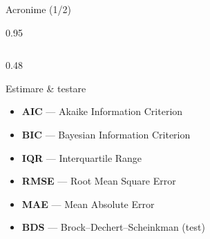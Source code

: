 \documentclass[9pt, aspectratio=169, t]{beamer}
\begin{document}
\begin{frame}{Acronime (1/2)}
\begin{cminipage}{0.95\textwidth}
{\begin{columns}[T]
\begin{column}{0.48\textwidth}
\begin{exampleblock}{Estimare \& testare}
\begin{itemize}
                    \item \textbf{AIC} --- Akaike Information Criterion
                    \item \textbf{BIC} --- Bayesian Information Criterion
                    \item \textbf{IQR} --- Interquartile Range
                    \item \textbf{RMSE} --- Root Mean Square Error
                    \item \textbf{MAE} --- Mean Absolute Error
                    \item \textbf{BDS} --- Brock--Dechert--Scheinkman (test)
                \end{itemize}
            \end{exampleblock}
        \end{column}
    \end{columns}
    }
    \end{cminipage}
\end{frame}
\end{document}
